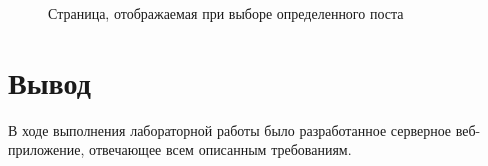 \documentclass[a4paper, 14pt]{extarticle}
\begin{document}
\begin{figure}[H]
  \centering
  \caption{Страница, отображаемая при выборе определенного поста}
  \label{fig:post.png}
\end{figure}

\newpage

\section{Вывод}

В ходе выполнения лабораторной работы было разработанное серверное
веб-приложение, отвечающее всем описанным требованиям.
\end{document}
